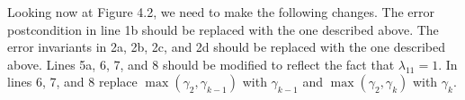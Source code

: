 \documentclass[letterpaper,10pt]{article}
\begin{document}
Looking now at Figure 4.2, we need to make the following changes. The error
postcondition in line 1b should be replaced with the one described above. The
error invariants in 2a, 2b, 2c, and 2d should be replaced with the one described
above. Lines 5a, 6, 7, and 8 should be modified to reflect the fact that
$\lambda_{11}=1$. In lines 6, 7, and 8 replace $\max(\gamma_2,\gamma_{k-1})$
with $\gamma_{k-1}$ and $\max(\gamma_2,\gamma_{k})$ with $\gamma_{k}$.
\end{document}
